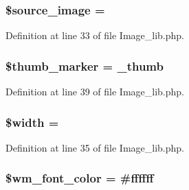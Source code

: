 \subsubsection[{\texorpdfstring{\$source\+\_\+image}{$source_image}}]{\setlength{\rightskip}{0pt plus 5cm}\$source\+\_\+image = \textquotesingle{}\textquotesingle{}}\hypertarget{class_c_i___image__lib_a54fc395722d5e9f15d656d22ba84e382}{}\label{class_c_i___image__lib_a54fc395722d5e9f15d656d22ba84e382}


Definition at line 33 of file Image\+\_\+lib.\+php.

\subsubsection[{\texorpdfstring{\$thumb\+\_\+marker}{$thumb_marker}}]{\setlength{\rightskip}{0pt plus 5cm}\$thumb\+\_\+marker = \textquotesingle{}\+\_\+thumb\textquotesingle{}}\hypertarget{class_c_i___image__lib_a3176700c651c0c3cd8cfa186ba03302a}{}\label{class_c_i___image__lib_a3176700c651c0c3cd8cfa186ba03302a}


Definition at line 39 of file Image\+\_\+lib.\+php.

\subsubsection[{\texorpdfstring{\$width}{$width}}]{\setlength{\rightskip}{0pt plus 5cm}\$width = \textquotesingle{}\textquotesingle{}}\hypertarget{class_c_i___image__lib_a5795120b4b324bc4ca83f1e6fdce7d57}{}\label{class_c_i___image__lib_a5795120b4b324bc4ca83f1e6fdce7d57}


Definition at line 35 of file Image\+\_\+lib.\+php.

\subsubsection[{\texorpdfstring{\$wm\+\_\+font\+\_\+color}{$wm_font_color}}]{\setlength{\rightskip}{0pt plus 5cm}\$wm\+\_\+font\+\_\+color = \textquotesingle{}\#ffffff\textquotesingle{}}\hypertarget{class_c_i___image__lib_ae9498442637ff2466d4426af45f68c6b}{}\label{class_c_i___image__lib_ae9498442637ff2466d4426af45f68c6b}



